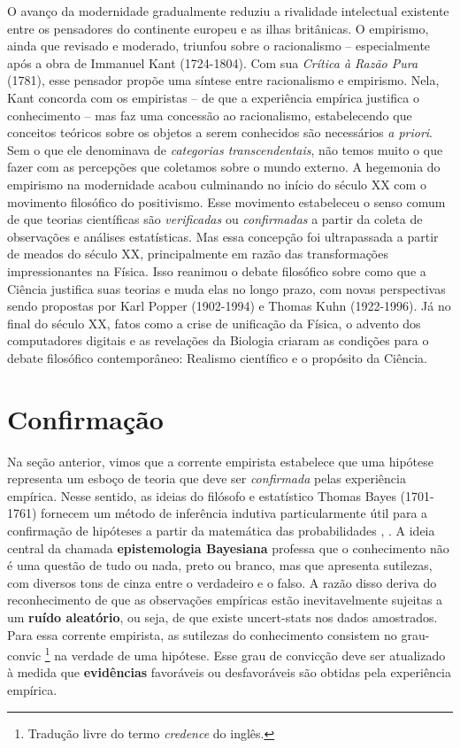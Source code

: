 \documentclass[./main.tex]{subfiles}
\begin{document}
\par O avanço da modernidade gradualmente reduziu a rivalidade intelectual existente entre os pensadores do continente europeu e as ilhas britânicas. O empirismo, ainda que revisado e moderado, triunfou sobre o racionalismo -- especialmente após a obra de Immanuel Kant (1724-1804). Com sua \textit{Crítica à Razão Pura} (1781), esse pensador propõe uma síntese entre racionalismo e empirismo. Nela, Kant concorda com os empiristas -- de que a experiência empírica justifica o conhecimento -- mas faz uma concessão ao racionalismo, estabelecendo que conceitos teóricos sobre os objetos a serem conhecidos são necessários \textit{a priori}. Sem o que ele denominava de \textit{categorias transcendentais}, não temos muito o que fazer com as percepções que coletamos sobre o mundo externo. A hegemonia do empirismo na modernidade  acabou culminando no início do século XX com o movimento filosófico do \gls{positivismo}. Esse movimento estabeleceu o senso comum de que teorias científicas são \textit{verificadas} ou \textit{confirmadas} a partir da coleta de observações e análises estatísticas. Mas essa concepção foi ultrapassada a partir de meados do século XX, principalmente em razão das transformações impressionantes na Física. Isso reanimou o debate filosófico sobre como que a Ciência justifica suas teorias e muda elas no longo prazo, com novas perspectivas sendo propostas por Karl Popper (1902-1994) e Thomas Kuhn (1922-1996).  Já no final do século XX, fatos como a crise de unificação da Física, o advento dos computadores digitais e as revelações da Biologia criaram as condições para o debate filosófico contemporâneo: Realismo científico e o propósito da Ciência. 

\section{Confirmação} \label{episteme:bayes}

\par Na seção anterior, vimos que a corrente empirista estabelece que uma hipótese representa um esboço de teoria que deve ser \textit{confirmada} pelas experiência empírica. Nesse sentido, as ideias do filósofo e estatístico Thomas Bayes (1701-1761) fornecem um método de inferência indutiva particularmente útil para a confirmação de hipóteses a partir da matemática das probabilidades \cite{sep-epistemology-bayesian}, \cite{sprenger2019}. A ideia central da chamada \textbf{epistemologia Bayesiana} professa que o conhecimento não é uma questão de tudo ou nada, preto ou branco, mas que apresenta sutilezas, com diversos tons de cinza entre o verdadeiro e o falso. A razão disso deriva do reconhecimento de que as observações empíricas estão inevitavelmente sujeitas a um \textbf{ruído aleatório}, ou seja, de que existe \gls{uncert-stats} nos dados amostrados. Para essa corrente empirista, as sutilezas do conhecimento consistem no \gls{grau-convic} \footnote{Tradução livre do termo \textit{credence} do inglês.} na verdade de uma hipótese. Esse grau de convicção deve ser atualizado à medida que \textbf{evidências} favoráveis ou desfavoráveis são obtidas pela experiência empírica. 
\end{document}
